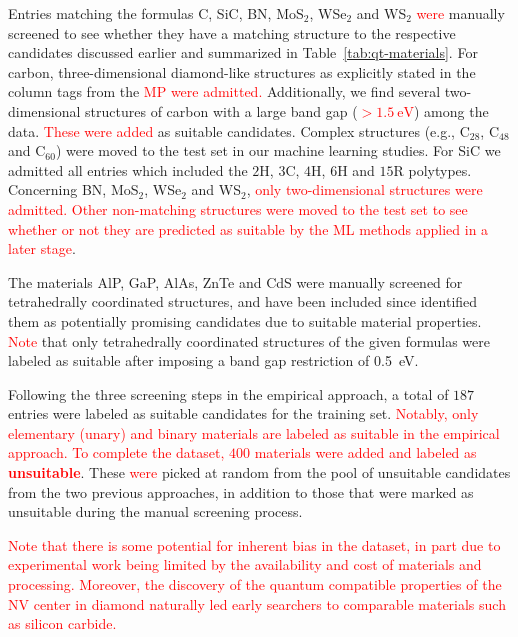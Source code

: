 \documentclass[superscriptaddress,unsortedaddress,
 amsmath,amssymb,
 aps,
]{revtex4-2}
\newcommand{\mrk}[1]{\textcolor{red}{#1}}
\begin{document}
Entries matching the formulas C, SiC, BN, MoS$_2$, WSe$_2$ and WS$_2$ \mrk{were} manually screened to see whether they have a matching structure to the respective candidates discussed earlier and summarized in Table~\ref{tab:qt-materials}. 
For carbon, three-dimensional diamond-like structures as explicitly stated in the column tags from the \mrk{MP} \mrk{were admitted.} Additionally, we find several two-dimensional structures of carbon with a large band gap (\mrk{$>\SI{1.5}{\electronvolt}$}) among the data. \mrk{These were added} as suitable candidates. Complex structures (e.g., C$_{28}$, C$_{48}$ and C$_{60}$) were moved to the test set in our machine learning studies. For SiC we admitted all entries which included the $2$H, $3$C, $4$H, $6$H and $15$R polytypes. Concerning BN, MoS$_2$, WSe$_2$ and WS$_2$, \mrk{only two-dimensional structures were admitted. 
Other non-matching structures were moved to the test set to see whether or not they are predicted as suitable by the ML methods applied in a later stage}.

The materials AlP, GaP, AlAs, ZnTe and CdS were manually screened for tetrahedrally coordinated structures, and have been included since \citeauthor{Weber2010} \cite{Weber2010} identified them as potentially promising candidates due to suitable material properties. 
\mrk{Note} that only tetrahedrally coordinated structures of the given formulas were labeled as suitable after imposing a band gap restriction of \SI{0.5}{\electronvolt}. 

Following the three screening steps in the empirical approach, a total of $187$ entries were labeled as suitable candidates for the training set. \mrk{Notably, only elementary (unary) and binary materials are labeled as suitable in the empirical approach.} \mrk{To complete the dataset, $400$ materials were added and labeled as \textbf{unsuitable}}. These \mrk{were} picked at random from the pool of unsuitable candidates from the two previous approaches, in addition to those that were marked as unsuitable during the manual screening process. 

\mrk{Note that there is some potential for inherent bias in the dataset, in part due to experimental work being limited by the availability and cost of materials and processing. Moreover, the discovery of the quantum compatible properties of the NV center in diamond naturally led early searchers to comparable materials such as silicon carbide.  %
} 
\end{document}
